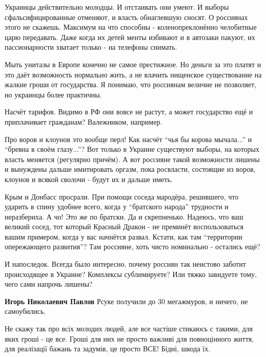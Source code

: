 \begin{itemize}
\begin{itemize}
Украинцы действительно молодцы. И отстаивать они умеют. И выборы
сфальсифицированные отменяют, и власть обнаглевшую сносят. О россиянах этого не
скажешь. Максимум на что способны - коленопреклонённо челобитные царю
передавать. Даже когда их детей менты избивают и в автозаки пакуют, их
пассионарности хватает только - на телефоны снимать.

Мыть унитазы в Европе конечно не самое престижное. Но деньги за это платят и
это даёт возможность нормально жить, а не влачить нищенское существование на
жалкие гроши от государства. Я понимаю, что россиянам величие не позволяет, но
украинцы более практичны.

Насчёт тарифов. Видимо в РФ они вовсе не растут, а может государство ещё и
приплачивает гражданам? Валежником, например.

Про воров и клоунов это вообще перл! Как насчёт \enquote{чья бы корова мычала...} и
\enquote{бревна в своём глазу...}? Вот только в Украине существуют выборы, на которых
власть меняется (регулярно причём). А вот россияне такой возможности лишены и
вынуждены дальше имитировать оргазм, пока росвласти, состоящие из воров, клоунов и
всякой сволочи - будут их и дальше иметь.

Крым и Донбасс просрали. При помощи соседа мародёра, решившего, что ударить в
спину удобнее всего, когда у \enquote{братского народа} трудности и неразбериха. А чо!
Это же по братски. Да и скрепненько. Надеюсь, что ваш великий сосед, тот который
Красный Дракон - не преминёт воспользоваться вашим примером, когда у вас
начнётся развал. Кстати, как там \enquote{территории опережающего развития}? Там
россияне, хоть чисто номинально - остались ещё?

И напоследок. Всегда было интересно, почему россиян так неистово заботит
происходящее в Украине? Комплексы сублимируете? Или тяжко завидуете тому, чего
сами напрочь лишены?

\textbf{Игорь Николаевич Павлов} Рсуке получили до 30 мегажмуров, и ничего, не самоубились.

\end{itemize} %


Не скажу так про всіх молодих людей, але все частіше стикаюсь с такими, для
яких гроші - це все. Гроші для них не просто важливі для повноцінного життя,
для реалізації бажань та задумів, це просто ВСЕ! Бідні, шкода їх.



\end{itemize}
